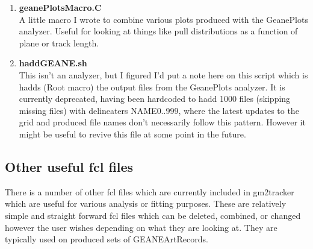 \begin{enumerate}
      \item{\bf{geanePlotsMacro.C}} \\
      A little macro I wrote to combine various plots produced with the GeanePlots analyzer. Useful for looking at things like pull distributions as a function of plane or track length.

      \item{\bf{haddGEANE.sh}} \\
      This isn't an analyzer, but I figured I'd put a note here on this script which is hadds (Root macro) the output files from the GeanePlots analyzer. It is currently deprecated, having been hardcoded to hadd 1000 files (skipping missing files) with delineaters {NAME}{0..999}, where the latest updates to the grid and produced file names don't necessarily follow this pattern. However it might be useful to revive this file at some point in the future.

    \end{enumerate}


  \subsection{Other useful fcl files}

    There is a number of other fcl files which are currently included in gm2tracker which are useful for various analysis or fitting purposes. These are relatively simple and straight forward fcl files which can be deleted, combined, or changed however the user wishes depending on what they are looking at. They are typically used on produced sets of GEANEArtRecords.

